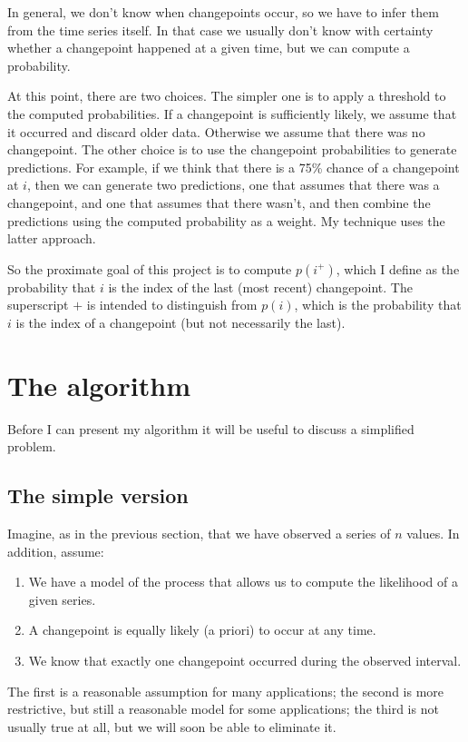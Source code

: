 \documentclass[twocolumn,11pt]{article}
\begin{document}
In general, we don't know when changepoints occur, so we have to
infer them from the time series itself.  In that case we usually
don't know with certainty whether a changepoint happened at a given
time, but we can compute a probability.

At this point, there are two choices.  The simpler one is to apply
a threshold to the computed probabilities.  If a changepoint is
sufficiently likely, we assume that it occurred and discard older
data.  Otherwise we assume that there was no changepoint.  The other
choice is to use the changepoint probabilities to generate
predictions.  For example, if we think that there is a 75\% chance
of a changepoint at $i$, then we can generate two predictions,
one that assumes that there was a changepoint, and one that assumes
that there wasn't, and then combine the predictions using the
computed probability as a weight.  My technique uses the latter
approach.

So the proximate goal of this project is to compute
$p(i^+)$, which I define as the probability that $i$ is the index
of the last (most recent) changepoint.  The superscript $+$ is intended
to distinguish from $p(i)$, which is the probability that $i$
is the index of a changepoint (but not necessarily the last).

\section{The algorithm}

Before I can present my algorithm it will be useful to discuss a
simplified problem.

\subsection{The simple version}

Imagine, as in the previous section, that
we have observed a series of $n$ values.  In addition, assume:

\begin{enumerate}

\item We have a model of the process that allows us to compute
the likelihood of a given series. 

\item A changepoint is equally likely (a priori) to occur at any time.

\item We know that exactly one changepoint occurred during the
observed interval.

\end{enumerate}
%
The first is a reasonable assumption for many applications;
the second is more restrictive, but still a reasonable model for
some applications;
the third is not usually true at all, but we will soon be able to
eliminate it.
\end{document}
